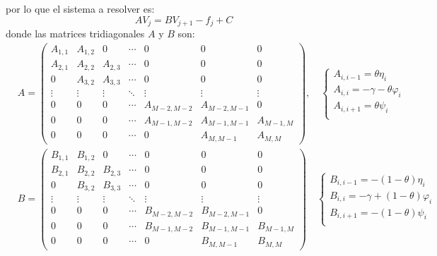 por lo que el sistema a resolver es:
\begin{equation*}
    \boxed{A V_j = B V_{j+1} - f_j + C}
\end{equation*}
donde las matrices tridiagonales $A$ y $B$ son:
\begin{align*}
    &\boxed{
        A = \begin{pmatrix}
            A_{1,1} & A_{1,2} & 0 & \cdots & 0 & 0 & 0 \\
            A_{2,1} & A_{2,2} & A_{2,3} & \cdots & 0 & 0 & 0 \\
            0 & A_{3,2} & A_{3,3} & \cdots & 0 & 0 & 0 \\
            \vdots & \vdots & \vdots & \ddots & \vdots & \vdots & \vdots \\
            0 & 0 & 0 & \cdots & A_{M-2,M-2} & A_{M-2,M-1} & 0 \\
            0 & 0 & 0 & \cdots & A_{M-1,M-2} & A_{M-1,M-1} & A_{M-1,M} \\
            0 & 0 & 0 & \cdots & 0  & A_{M,M-1} & A_{M,M}
        \end{pmatrix},
        \quad \begin{cases}
            A_{i,i-1} = \theta\eta_i \\
            A_{i,i} = -\gamma - \theta \varphi_i \\
            A_{i,i+1} = \theta\psi_i \\
        \end{cases}
    } \\
    & \boxed{
        B = \begin{pmatrix}
            B_{1,1} & B_{1,2} & 0 & \cdots & 0 & 0 & 0 \\
            B_{2,1} & B_{2,2} & B_{2,3} & \cdots & 0 & 0 & 0 \\
            0 & B_{3,2} & B_{3,3} & \cdots & 0 & 0 & 0 \\
            \vdots & \vdots & \vdots & \ddots & \vdots & \vdots & \vdots \\
            0 & 0 & 0 & \cdots & B_{M-2,M-2} & B_{M-2,M-1} & 0 \\
            0 & 0 & 0 & \cdots & B_{M-1,M-2} & B_{M-1,M-1} & B_{M-1,M} \\
            0 & 0 & 0 & \cdots & 0  & B_{M,M-1} & B_{M,M}
        \end{pmatrix}
        \quad \begin{cases}
            B_{i,i-1} = -(1-\theta)\eta_i \\
            B_{i,i} = -\gamma + (1-\theta) \varphi_i \\
            B_{i,i+1} = -(1-\theta)\psi_i \\
        \end{cases}
    }
\end{align*}
